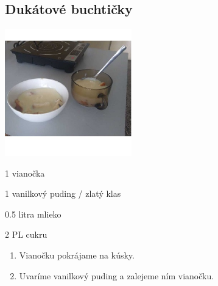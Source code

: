 \setcounter{step}{0}
\subsection{Dukátové buchtičky}

\begin{ingredient}
\includegraphics[height=5.5cm]{images/dukatky}
\def\portions{2}%

\begin{main}
	\item 1 vianočka
	\item 1 vanilkový puding / zlatý klas
	\item 0.5 litra mlieko
	\item 2 PL cukru
\end{main}
\end{ingredient}
\begin{recipe}

\begin{enumerate}


\item{Vianočku pokrájame na kúsky.}
\item{Uvaríme vanilkový puding a zalejeme ním vianočku.}

\end{enumerate}
\end{recipe}

\begin{notes}

\end{notes}
\clearpage	

